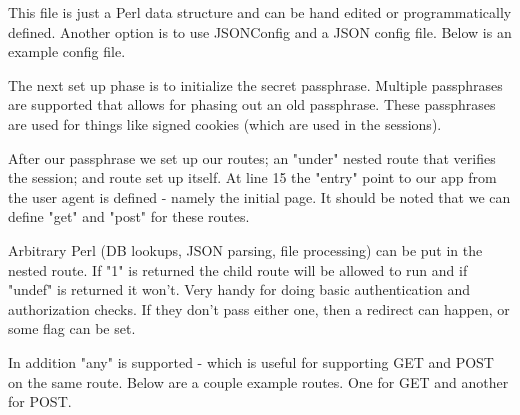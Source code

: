 \documentclass[14pt]{extreport}
\newcommand\Small{\fontsize{12}{13.0}\fontencoding{T1}\selectfont}
\newcommand*\LSTfont{\Small\ttfamily\SetTracking{encoding=*}{-60}\lsstyle}
\begin{document}


This file is just a Perl data structure and can be hand edited or
programmatically defined.  Another option is to use JSONConfig and a JSON
config file.  Below is an example config file.



The next set up phase is to initialize the secret passphrase.  Multiple
passphrases are supported that allows for phasing out an old passphrase.  These
passphrases are used for things like signed cookies (which are used in the
sessions).





After our passphrase we set up our routes; an "under" nested route that verifies
the session; and route set up itself.  At line 15 the "entry" point to our app
from the user agent is defined - namely the initial page.  It should be noted
that we can define "get" and "post" for these routes.  



Arbitrary Perl (DB lookups, JSON parsing, file processing) can be put in the
nested route.  If "1" is returned the child route will be allowed to run and if
"undef" is returned it won't.  Very handy for doing basic authentication and
authorization checks.  If they don't pass either one, then a redirect can
happen, or some flag can be set.

In addition "any" is supported - which is useful for supporting GET and POST on
the same route.  Below are a couple example routes.  One for GET and another
for POST.


\end{document}
